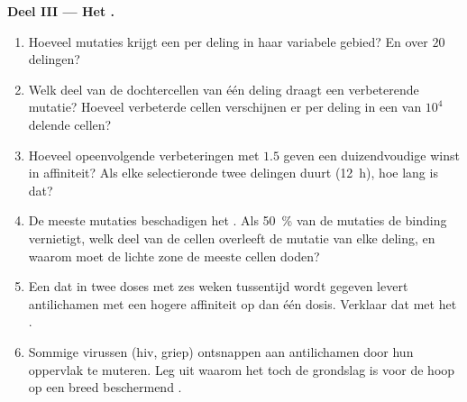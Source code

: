 \begin{problem}
\medskip
\noindent\textbf{Deel III --- Het .}
\begin{enumerate}[resume]
  \item Hoeveel mutaties krijgt een  per deling in haar variabele
        gebied? En over $20$ delingen?
  \item Welk deel van de dochtercellen van één deling draagt een
        verbeterende mutatie? Hoeveel verbeterde cellen verschijnen er
        per deling in een  van $10^{4}$ delende cellen?
  \item Hoeveel opeenvolgende verbeteringen met $1.5$ geven een
        duizendvoudige winst in affiniteit? Als elke selectieronde twee
        delingen duurt (\qty{12}{h}), hoe lang is dat?
  \item De meeste mutaties beschadigen het . Als
        \qty{50}{\%} van de mutaties de binding vernietigt, welk deel
        van de cellen overleeft de mutatie van elke deling, en waarom
        moet de lichte zone de meeste cellen doden?
  \item Een  dat in twee doses met zes weken tussentijd wordt
        gegeven levert antilichamen met een hogere affiniteit op dan
        één dosis. Verklaar dat met het .
  \item Sommige virussen (hiv, griep) ontsnappen aan antilichamen door
        hun oppervlak te muteren. Leg uit waarom het  toch
        de grondslag is voor de hoop op een breed beschermend .
\end{enumerate}


\end{problem}
